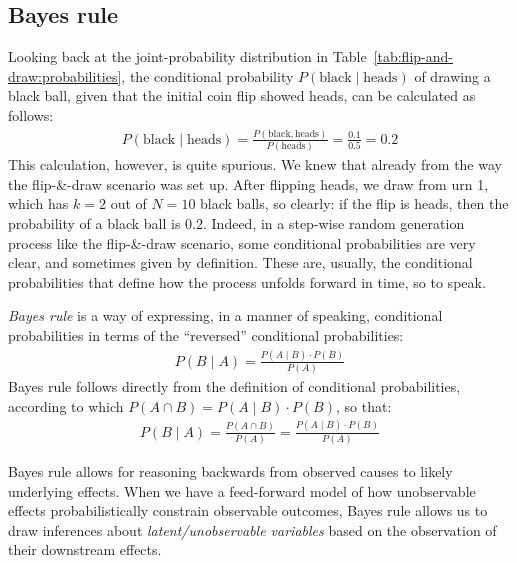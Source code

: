\documentclass[nobib,nofonts]{tufte-handout}
\renewcommand{\markdef}[1]{\emph{#1}}
\newcommand{\mult}{\ensuremath{\cdot}}
\begin{document}
\subsection{Bayes rule}

Looking back at the joint-probability distribution in
Table~\ref{tab:flip-and-draw:probabilities}, the conditional probability
$P(\text{black} \mid \text{heads})$ of drawing a black ball, given that the initial coin flip
showed heads, can be calculated as follows:
\begin{align*}
  P(\text{black} \mid \text{heads}) = \frac{P(\text{black} , \text{heads})}{P(\text{heads})} =
  \frac{0.1}{0.5} = 0.2
\end{align*}
This calculation, however, is quite spurious. We knew that already from the way the
flip-\&-draw scenario was set up. After flipping heads, we draw from urn 1, which has $k=2$ out
of $N=10$ black balls, so clearly: if the flip is heads, then the probability of a black ball
is $0.2$. Indeed, in a step-wise random generation process like the flip-\&-draw scenario, some
conditional probabilities are very clear, and sometimes given by definition. These are,
usually, the conditional probabilities that define how the process unfolds forward in time, so
to speak.

\markdef{Bayes rule} is a way of expressing, in a manner of speaking, conditional probabilities in terms of the
``reversed'' conditional probabilities:
\begin{align*}
  P(B \mid A) = \frac{P(A \mid B) \mult P(B)}{P(A)}
\end{align*}
Bayes rule follows directly from the definition of conditional probabilities,
according to which $P(A \cap B) = P(A \mid B) \mult P(B)$, so that:
\begin{align*}
  P(B \mid A) = \frac{P(A \cap B)}{P(A)} = \frac{P(A \mid B) \cdot P(B)}{P(A)}
\end{align*}

Bayes rule allows for reasoning backwards from observed causes to likely underlying effects.
When we have a feed-forward model of how unobservable effects probabilistically constrain
observable outcomes, Bayes rule allows us to draw inferences about \emph{latent/unobservable
  variables} based on the observation of their downstream effects.
\end{document}
